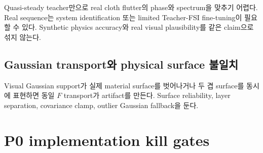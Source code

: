 \documentclass[11pt,a4paper]{article}
\begin{document}
Quasi-steady teacher만으로 real cloth flutter의 phase와 spectrum을 맞추기 어렵다.
Real sequence는 system identification 또는 limited Teacher-FSI fine-tuning이 필요할 수 있다.
Synthetic physics accuracy와 real visual plausibility를 같은 claim으로 섞지 않는다.

\subsection{Gaussian transport와 physical surface 불일치}

Visual Gaussian support가 실제 material surface를 벗어나거나
두 겹 surface를 동시에 표현하면 동일 \(F\) transport가 artifact를 만든다.
Surface reliability, layer separation, covariance clamp,
outlier Gaussian fallback을 둔다.

\section{P0 implementation kill gates}
\end{document}
